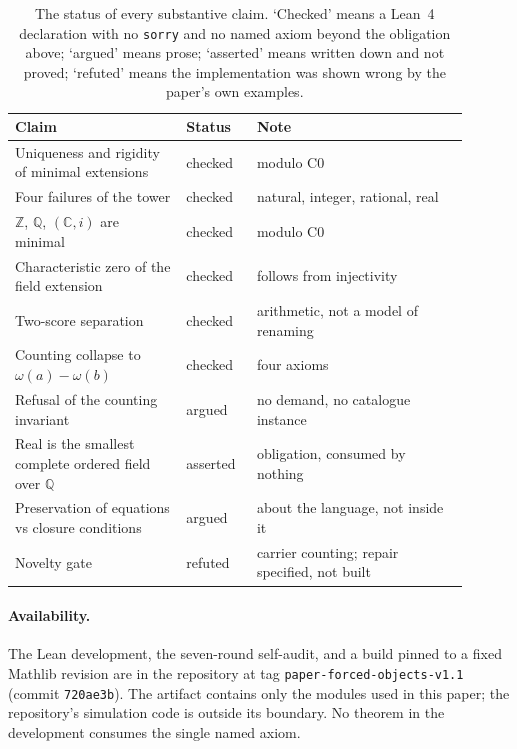 \documentclass[12pt,a4paper]{article}
\begin{document}
\begin{table}[h]
\centering
\small
\begin{tabular}{@{}p{0.34\linewidth}p{0.14\linewidth}p{0.42\linewidth}@{}}
\toprule
Claim & Status & Note \\
\midrule
Uniqueness and rigidity of minimal extensions & checked & modulo C0 \\
Four failures of the tower & checked & natural, integer, rational, real \\
$\mathbb{Z}$, $\mathbb{Q}$, $(\mathbb{C},i)$ are minimal & checked & modulo C0 \\
Characteristic zero of the field extension & checked & follows from injectivity \\
Two-score separation & checked & arithmetic, not a model of renaming \\
Counting collapse to $\omega(a)-\omega(b)$ & checked & four axioms \\
Refusal of the counting invariant & argued & no demand, no catalogue instance \\
Real is the smallest complete ordered field over $\mathbb{Q}$ & asserted & obligation, consumed by nothing \\
Preservation of equations vs closure conditions & argued & about the language, not inside it \\
Novelty gate & refuted & carrier counting; repair specified, not built \\
\bottomrule
\end{tabular}
\caption{The status of every substantive claim.  `Checked' means a Lean~4
declaration with no \texttt{sorry} and no named axiom beyond the obligation
above; `argued' means prose; `asserted' means written down and not proved;
`refuted' means the implementation was shown wrong by the paper's own examples.}
\end{table}

\paragraph{Availability.}
The Lean development, the seven-round self-audit, and a build pinned to a fixed
Mathlib revision are in the repository at tag \texttt{paper-forced-objects-v1.1}
(commit \texttt{720ae3b}).  The artifact contains only the modules used in this
paper; the repository's simulation code is outside its boundary.  No theorem in
the development consumes the single named axiom.



\end{document}
